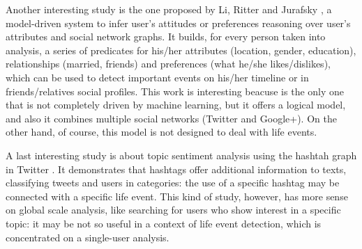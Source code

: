 Another interesting study is the one proposed by Li, Ritter and Jurafsky \cite{li2014inferring}, a model-driven system to infer user's attitudes or preferences reasoning over user's attributes and social network graphs. It builds, for every person taken into analysis, a series of predicates for his/her attributes (location, gender, education), relationships (married, friends) and preferences (what he/she likes/dislikes), which can be used to detect important events on his/her timeline or in friends/relatives social profiles. This work is interesting beacuse is the only one that is not completely driven by machine learning, but it offers a logical model, and also it combines multiple social networks (Twitter and Google+). On the other hand, of course, this model is not designed to deal with life events.

A last interesting study is about topic sentiment analysis using the hashtah graph in Twitter \cite{wang2011topic}. It demonstrates that hashtags offer additional information to texts, classifying tweets and users in categories: the use of a specific hashtag may be connected with a specific life event. This kind of study, however, has more sense on global scale analysis, like searching for users who show interest in a specific topic: it may be not so useful in a context of life event detection, which is concentrated on a single-user analysis.